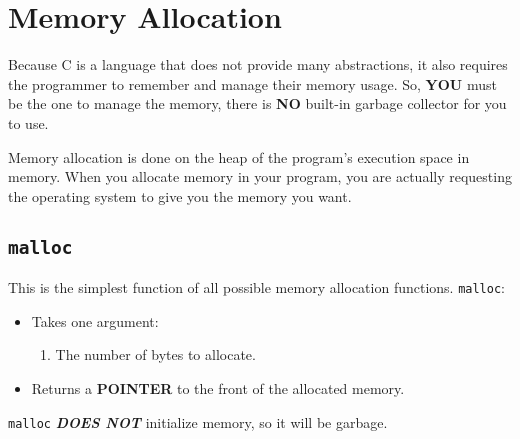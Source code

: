 \section{Memory Allocation}\label{sec:Memory_Allocation}
Because C is a language that does not provide many abstractions, it also requires the programmer to remember and manage their memory usage.
So, \textbf{YOU} must be the one to manage the memory, there is \textbf{NO} built-in garbage collector for you to use.

Memory allocation is done on the heap of the program's execution space in memory.
When you allocate memory in your program, you are actually requesting the operating system to give you the memory you want.

\subsection{\texttt{malloc}}\label{subsec:malloc}
This is the simplest function of all possible memory allocation functions.
\texttt{malloc}:
\begin{itemize}
\item Takes one argument:
  \begin{enumerate}
  \item The number of bytes to allocate.
  \end{enumerate}
\item Returns a \textbf{POINTER} to the front of the allocated memory.
\end{itemize}

\texttt{malloc} {\large{\textbf{\emph{DOES NOT}}}} initialize memory, so it will be garbage.


